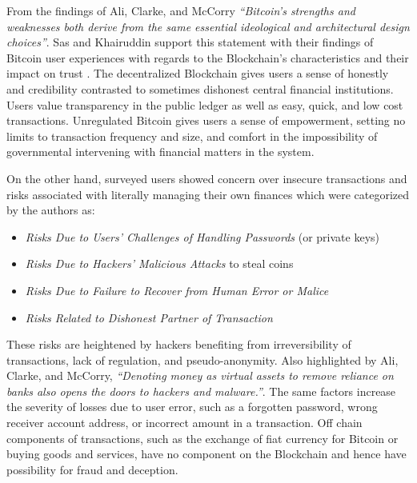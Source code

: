 \documentclass[a4paper,12pt]{article} %
\begin{document}
From the findings of Ali, Clarke, and McCorry \textit{``Bitcoin’s strengths and weaknesses both derive from the same essential ideological and architectural design choices''}\cite{Ali:2015:BPU:2990603.2990632}. Sas and Khairuddin support this statement with their findings of Bitcoin user experiences with regards to the Blockchain's characteristics and their impact on trust \cite{sas2016design}. The decentralized Blockchain gives users a sense of honestly and credibility contrasted to sometimes dishonest central financial institutions. Users value transparency in the public ledger as well as easy, quick, and low cost transactions. Unregulated Bitcoin gives users a sense of empowerment, setting no limits to transaction frequency and size, and comfort in the impossibility of governmental intervening with financial matters in the system.

On the other hand, surveyed users showed concern over insecure transactions and risks associated with literally managing their own finances which were categorized by the authors as:
\begin{itemize}
	\item \textit{Risks Due to Users' Challenges of Handling Passwords} (or private keys)
	\item \textit{Risks Due to Hackers' Malicious Attacks} to steal coins
	\item \textit{Risks Due to Failure to Recover from Human Error or Malice}
	\item \textit{Risks Related to Dishonest Partner of Transaction}
\end{itemize}
These risks are heightened by hackers benefiting from irreversibility of transactions, lack of regulation, and pseudo-anonymity. Also highlighted by Ali, Clarke, and McCorry, \textit{``Denoting money as virtual assets to remove reliance on banks also opens the doors to hackers and malware.''}\cite{Ali:2015:BPU:2990603.2990632}. The same factors increase the severity of losses due to user error, such as a forgotten password, wrong receiver account address, or incorrect amount in a transaction. Off chain components of transactions, such as the exchange of fiat currency for Bitcoin or buying goods and services, have no component on the Blockchain and hence have possibility for fraud and deception.
\end{document}
